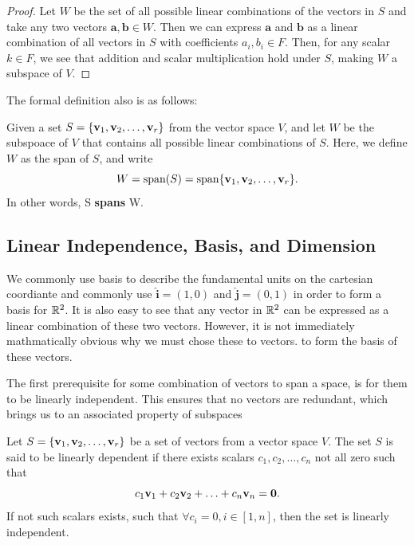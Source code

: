 \documentclass[12pt]{article}
\begin{document}
\begin{proof}
    Let $W$ be the set of all possible linear combinations of the vectors in $S$ and take any two vectors $\mathbf{a}, \mathbf{b} \in W$. Then we can express $\mathbf{a}$ and $\mathbf{b}$ as a linear combination of all vectors in $S$ with coefficients $a_i, b_i \in F$. Then, for any scalar $k \in F$, we see that addition and scalar multiplication hold under $S$, making $W$ a subspace of $V$.
\end{proof}

The formal definition also is as follows:

\begin{definition}[Span]
    Given a set $S = \{\mathbf{v}_1, \mathbf{v}_2, \ldots, \mathbf{v}_r\}$ from the vector space $V$, and let $W$ be the subspoace of $V$ that contains all possible linear combinations of $S$. Here, we define $W$ as the span of $S$, and write $$W = \text{span}(S) = \text{span}\{\mathbf{v}_1, \mathbf{v}_2, \ldots, \mathbf{v}_r\}.$$ In other words, S \textbf{spans} W. 
\end{definition}



\subsection{Linear Independence, Basis, and Dimension}

We commonly use basis to describe the fundamental units on the cartesian coordiante and commonly use $\mathbf{\hat{i}} = (1, 0)$ and $\mathbf{\hat{j}} = (0, 1)$ in order to form a basis for $\mathbb{R}^2$. It is also easy to see that any vector in $\mathbb{R}^2$ can be expressed as a linear combination of these two vectors. However, it is not immediately mathmatically obvious why we must chose these to vectors.  to form the basis of these vectors. 

The first prerequisite for some combination of vectors to span a space, is for them to be linearly independent. This ensures that no vectors are redundant, which brings us to an associated property of subspaces

\begin{definition}
    Let $S = \{\mathbf{v}_1, \mathbf{v}_2, \ldots, \mathbf{v}_r\}$ be a set of vectors from a vector space $V$. The set $S$ is said to be linearly dependent if there exists scalars $c_1, c_2, \ldots, c_n$ not all zero such that $$c_1 \mathbf{v}_1 + c_2 \mathbf{v}_2 + \ldots + c_n \mathbf{v}_n = \mathbf{0}.$$ If not such scalars exists, such that $\forall c_i = 0, i \in [1, n]$, then the set is linearly independent. 
\end{definition}
\end{document}
